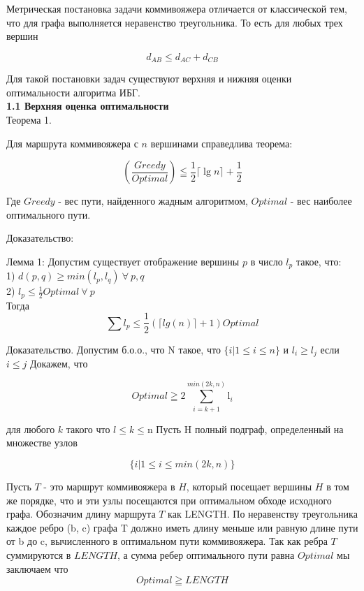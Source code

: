 \documentclass[a4paper, 14pt]{extarticle}
\begin{document}
Метрическая постановка задачи коммивояжера отличается от классической тем, что для графа выполняется неравенство треугольника. То есть для любых трех вершин

\begin{equation}
d_{AB} \leq d_{AC} + d_{CB}
\end{equation}

Для такой постановки задач существуют верхняя и нижняя оценки оптимальности алгоритма ИБГ. \\


\textbf{1.1 Верхняя оценка оптимальности}\\

Теорема 1.

Для маршрута коммивояжера с $n$ вершинами справедлива теорема:

\begin{equation}
	(\frac{Greedy}{Optimal}) \leqq \frac{1}{2}\lceil{\lg n}\rceil + \frac{1}{2}
\end{equation}

Где $Greedy$ - вес пути, найденного жадным алгоритмом, $Optimal$ - вес наиболее оптимального пути.

Доказательство:

Лемма 1: Допустим существует отображение вершины $p$ в число $l_p$ такое, что:\\
1) $d(p,q) \geq min(l_p, l_q) \: \forall \: p,q$\\
2) $l_p \leq \frac{1}{2}Optimal\: \forall \: p $\\
Тогда 
\begin{equation}
\sum l_p \leq \frac{1}{2}(\lceil lg(n)\rceil+1)Optimal
\end{equation}

Доказательство.
Допустим б.о.о., что N такое, что  $\{i|1 \leq i \leq n \}$  и $l_i \geq l_j$ если $i \leq j$
Докажем, что 

\begin{equation}\label{metriclowerbound}
	{Optimal} \geqq 2\sum_{i=k+1}^{min(2k,n)}\mathrm{l}_i
\end{equation}

для любого $k$ такого что $l \leq k \leq $n
Пусть H полный подграф, определенный на множестве узлов

\begin{equation}
	{\{i|1 \leq i \leq min(2k, n)\}}
\end{equation}

Пусть $T$ - это маршрут коммивояжера в $H$, который посещает вершины $H$ в том же порядке, что и эти узлы посещаются при оптимальном обходе исходного графа. Обозначим длину маршрута $T$ как LENGTH. По неравенству треугольника каждое ребро (b, c) графа T должно иметь длину меньше или равную длине пути от b до c, вычисленного в оптимальном пути коммивояжера. Так как ребра $T$ суммируются в $LENGTH$, а сумма ребер оптимального пути равна $Optimal$ мы заключаем что
\begin{equation}
	{Optimal} \geqq {LENGTH}
\end{equation}
\end{document}

